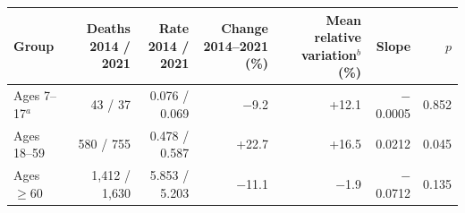 \begin{tabular}{lrrrrrr}
\toprule
Group & Deaths 2014 / 2021 & Rate 2014 / 2021 & Change 2014--2021 (\%) & Mean relative variation$^{b}$ (\%) & Slope & $p$ \\
\midrule
Ages 7--17$^{a}$ & 43 / 37 & 0.076 / 0.069 & $-$9.2 & +12.1 & $-$0.0005 & 0.852 \\
Ages 18--59 & 580 / 755 & 0.478 / 0.587 & +22.7 & +16.5 & 0.0212 & 0.045 \\
Ages $\geq$60 & 1,412 / 1,630 & 5.853 / 5.203 & $-$11.1 & $-$1.9 & $-$0.0712 & 0.135 \\
\bottomrule
\end{tabular}
